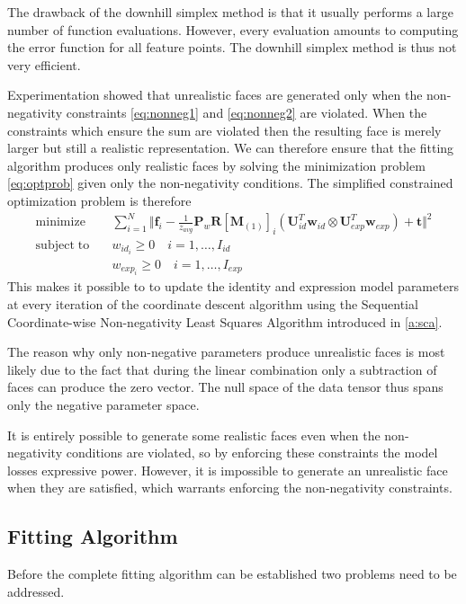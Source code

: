 \documentclass[11pt,a4paper]{report}
\begin{document}
The drawback of the downhill simplex method is that it usually performs a large
number of function evaluations. However, every evaluation amounts to computing the
error function for all feature points. The downhill simplex method is thus not
very efficient.

Experimentation showed that unrealistic faces are generated only when the
non-negativity constraints \ref{eq:nonneg1} and \ref{eq:nonneg2} are
violated. When the constraints which ensure the sum are violated then the
resulting face is merely larger but still a realistic representation. We can therefore ensure that the fitting algorithm produces only
realistic faces by solving the minimization problem \ref{eq:optprob} given only the non-negativity
conditions. The simplified constrained optimization problem is therefore  
\begin{align}
\mathrm{minimize}\quad &\sum_{i=1}^N \Big\Vert\mathbf{f}_i - \frac{1}{z_{avg}}\mathbf{P}_w\mathbf{R}[\mathbf{M}_{(1)}]_{i}(\mathbf{U}_{id}^T\mathbf{w}_{id} \otimes
\mathbf{U}_{exp}^T\mathbf{w}_{exp}) + \mathbf{t}\Big\Vert^2\\
\mathrm{subject\; to}\quad &w_{id_i} \ge 0 \quad i=1,\ldots ,I_{id}\\\
&w_{exp_i} \ge 0 \quad i=1,\ldots ,I_{exp}
\end{align}
This makes it possible to to update the identity and
expression model parameters at every iteration of the coordinate descent
algorithm using the Sequential Coordinate-wise Non-negativity
Least Squares Algorithm introduced in \ref{a:sca}. 

The reason why only non-negative parameters produce unrealistic faces is most
likely due to the fact that during the linear combination only a subtraction of
faces can produce the zero vector. The null space of the data tensor thus spans only the negative
parameter space. 

It is entirely possible to generate some realistic
faces even when the non-negativity conditions are violated, so by enforcing
these constraints the model losses expressive power. However, it is
impossible to generate an unrealistic face when they are satisfied, which
warrants enforcing the non-negativity constraints.

\subsection{Fitting Algorithm}\label{s:fitalgo}
Before the complete fitting algorithm can be established two problems need to be
addressed. 
\end{document}
